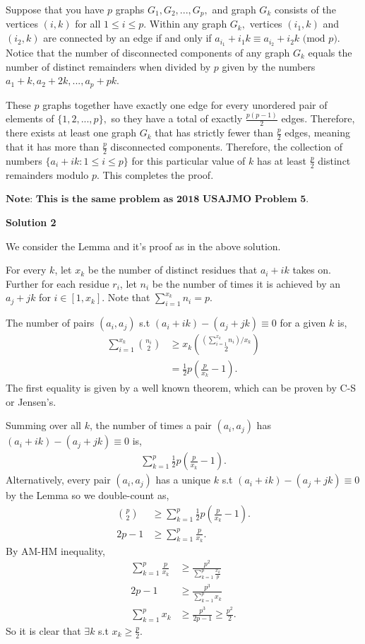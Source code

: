\begin{enumerate}
 Suppose that you have $p$ graphs $G_1, G_2, ..., G_p,$ and graph $G_k$ consists of the vertices $(i, k)$ for all $1\le i\le p.$ Within any graph $G_k,$ vertices $(i_1, k)$ and $(i_2, k)$ are connected by an edge if and only if $a_{i_1} + i_1k\equiv a_{i_2} + i_2k\text{ (mod } p\text{)}.$ Notice that the number of disconnected components of any graph $G_k$ equals the number of distinct remainders when divided by $p$ given by the numbers $a_1 + k, a_2 + 2k, ..., a_p + pk.$

 These $p$ graphs together have exactly one edge for every unordered pair of elements of $\{1, 2, ..., p\},$ so they have a total of exactly $\frac{p(p-1)}{2}$ edges. Therefore, there exists at least one graph $G_k$ that has strictly fewer than $\frac{p}{2}$ edges, meaning that it has more than $\frac{p}{2}$ disconnected components. Therefore, the collection of numbers $\{a_i + ik: 1\le i\le p\}$ for this particular value of $k$ has at least $\frac{p}{2}$ distinct remainders modulo $p.$ This completes the proof.

 $\textbf{Note: This is the same problem as 2018 USAJMO Problem 5.}$




\textbf{Solution 2}

We consider the Lemma and it's proof as in the above solution.

 For every $k$, let $x_k$ be the number of distinct residues that $a_i + ik$ takes on. Further for each residue $r_i$, let $n_i$ be the number of times it is achieved by an $a_j + jk$ for $i \in [1, x_k]$. Note that $\sum_{i = 1}^{x_k} n_i = p.$

 The number of pairs $(a_i, a_j)$ s.t $(a_i + ik) - (a_j + jk) \equiv 0$ for a given $k$ is,
 \begin{align*} \sum_{i = 1}^{x_k} \binom{n_i}{2} &\ge x_k \binom{(\sum_{i = 1}^{x_k} n_i)/x_k}{2} \\ &= \frac{1}{2}p(\frac{p}{x_k} - 1). \end{align*}
The first equality is given by a well known theorem, which can be proven by C-S or Jensen's.

 Summing over all $k$, the number of times a pair $(a_i, a_j)$ has $(a_i + ik) - (a_j + jk) \equiv 0$ is,
 \begin{align*} \sum_{k = 1}^{p} \frac{1}{2}p(\frac{p}{x_k} - 1). \end{align*}
Alternatively, every pair $(a_i, a_j)$ has a unique $k$ s.t $(a_i + ik) - (a_j + jk) \equiv 0$ by the Lemma so we double-count as,
 \begin{align*} \binom{p}{2} &\ge \sum_{k = 1}^{p} \frac{1}{2}p(\frac{p}{x_k} - 1). \\ 2p - 1 &\ge \sum_{k = 1}^{p} \frac{p}{x_k}. \end{align*}
By AM-HM inequality,
 \begin{align*} \sum_{k = 1}^{p} \frac{p}{x_k} &\ge \frac{p^2}{\sum_{k = 1}^{p} \frac{x_k}{p}} \\ 2p-1 &\ge \frac{p^3}{\sum_{k = 1}^{p} x_k} \\ \sum_{k = 1}^{p}x_k &\ge \frac{p^3}{2p-1} \ge \frac{p^2}{2}. \end{align*}
So it is clear that $\exists k$ s.t $x_k \ge \frac{p}{2}$.


\end{enumerate}
